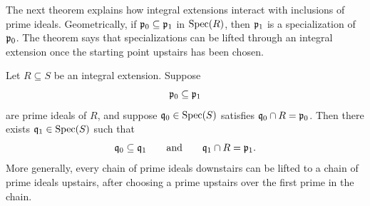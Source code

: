 \documentclass[12pt,reqno]{amsart}
\begin{document}
\hrulefill

The next theorem explains how integral extensions interact with inclusions of prime ideals. Geometrically, if $\mathfrak{p}_0\subseteq \mathfrak{p}_1$ in $\operatorname{Spec}(R)$, then $\mathfrak{p}_1$ is a specialization of $\mathfrak{p}_0$. The theorem says that specializations can be lifted through an integral extension once the starting point upstairs has been chosen.

\begin{theorem}[Going Up]
Let $R\subseteq S$ be an integral extension. Suppose
\[
\mathfrak{p}_0\subseteq \mathfrak{p}_1
\]
are prime ideals of $R$, and suppose $\mathfrak{q}_0\in\operatorname{Spec}(S)$ satisfies $\mathfrak{q}_0\cap R=\mathfrak{p}_0$. Then there exists $\mathfrak{q}_1\in\operatorname{Spec}(S)$ such that
\[
\mathfrak{q}_0\subseteq \mathfrak{q}_1
\qquad\text{and}\qquad
\mathfrak{q}_1\cap R=\mathfrak{p}_1.
\]
More generally, every chain of prime ideals downstairs can be lifted to a chain of prime ideals upstairs, after choosing a prime upstairs over the first prime in the chain.
\end{theorem}

\hrulefill
\end{document}
